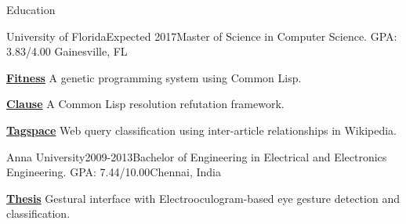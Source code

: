 \documentclass{resume} %
\begin{document}

\begin{rSection}{Education}
\vspace{2mm}

\begin{rSubsection}{University of Florida}{Expected 2017}{Master of Science in Computer Science. GPA: 3.83/4.00
}{Gainesville, FL}
\item {\bf {\href{http://github.com/pranavrc/fitness/}{Fitness}}} A genetic programming system using Common Lisp.
\item {\bf {\href{http://github.com/pranavrc/clause/}{Clause}}} A Common Lisp resolution refutation framework.
\item {\bf {\href{http://github.com/pranavrc/tagspace/}{Tagspace}}} Web query classification using inter-article relationships in Wikipedia.
\end{rSubsection}

\begin{rSubsection}{Anna University}{2009-2013}{Bachelor of Engineering in Electrical and Electronics Engineering. GPA: 7.44/10.00}{Chennai, India}
\item {\bf {\href{http://onloop.net/hairyplotter/}{Thesis}}} Gestural interface with Electrooculogram-based eye gesture detection and classification.
\end{rSubsection}

\end{rSection}

\end{document}
